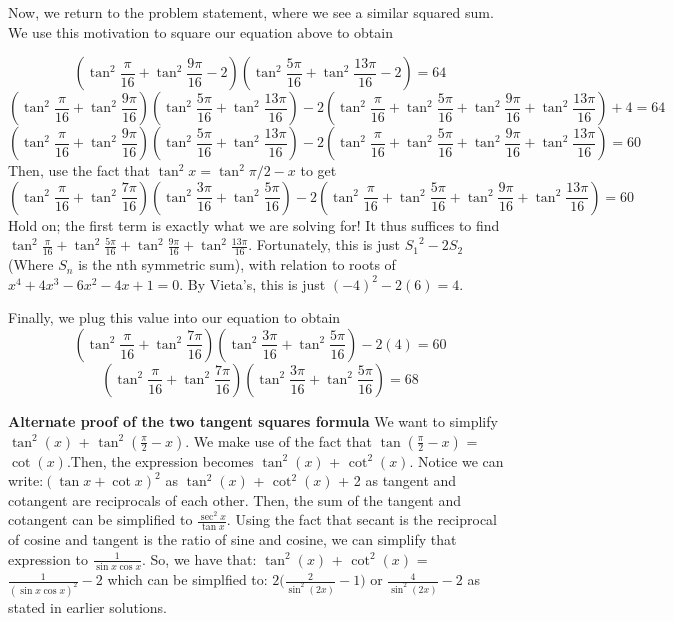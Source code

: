 \begin{enumerate}
 Now, we return to the problem statement, where we see a similar squared sum. We use this motivation to square our equation above to obtain 

 
 \[(\tan^2\frac{\pi}{16}+\tan^2\frac{9\pi}{16}-2)(\tan^2\frac{5\pi}{16}+\tan^2\frac{13\pi}{16}-2)=64\]
 \[(\tan^2\frac{\pi}{16}+\tan^2\frac{9\pi}{16})(\tan^2\frac{5\pi}{16}+\tan^2\frac{13\pi}{16})-2(\tan^2\frac{\pi}{16}+\tan^2\frac{5\pi}{16}+\tan^2\frac{9\pi}{16}+\tan^2\frac{13\pi}{16})+4=64\]
 \[(\tan^2\frac{\pi}{16}+\tan^2\frac{9\pi}{16})(\tan^2\frac{5\pi}{16}+\tan^2\frac{13\pi}{16})-2(\tan^2\frac{\pi}{16}+\tan^2\frac{5\pi}{16}+\tan^2\frac{9\pi}{16}+\tan^2\frac{13\pi}{16})=60\]Then, use the fact that $\tan^2{x}=\tan^2{\pi/2-x}$ to get
 \[(\tan^2\frac{\pi}{16}+\tan^2\frac{7\pi}{16})(\tan^2\frac{3\pi}{16}+\tan^2\frac{5\pi}{16})-2(\tan^2\frac{\pi}{16}+\tan^2\frac{5\pi}{16}+\tan^2\frac{9\pi}{16}+\tan^2\frac{13\pi}{16})=60\]Hold on; the first term is exactly what we are solving for! It thus suffices to find $\tan^2\frac{\pi}{16}+\tan^2\frac{5\pi}{16}+\tan^2\frac{9\pi}{16}+\tan^2\frac{13\pi}{16}$. Fortunately, this is just ${S_1}^2-2{S_2}$ (Where $S_n$ is the nth symmetric sum), with relation to roots of $x^4+4x^3-6x^2-4x+1=0$. By Vieta's, this is just $(-4)^2-2(6)=4$. 

 Finally, we plug this value into our equation to obtain 
 \[(\tan^2\frac{\pi}{16}+\tan^2\frac{7\pi}{16})(\tan^2\frac{3\pi}{16}+\tan^2\frac{5\pi}{16})-2(4)=60\]
 \[(\tan^2\frac{\pi}{16}+\tan^2\frac{7\pi}{16})(\tan^2\frac{3\pi}{16}+\tan^2\frac{5\pi}{16})=\boxed{68}\]

 \textbf{Alternate proof of the two tangent squares formula} We want to simplify $\tan^{2}(x)$ + $\tan^{2}(\frac{\pi}{2} - x)$. We make use of the fact that $\tan(\frac{\pi}{2} - x)$ = $\cot(x)$.Then, the expression becomes $\tan^{2}(x)$ + $\cot^{2}(x)$. Notice we can write:$(\tan x + \cot x)^{2}$ as $\tan^{2}(x)$ + $\cot^{2}(x)$ + 2 as tangent and cotangent are reciprocals of each other. Then, the sum of the tangent and cotangent can be simplified to $\frac{\sec^{2}{x}}{\tan x}$. Using the fact that secant is the reciprocal of cosine and tangent is the ratio of sine and cosine, we can simplify that expression to $\frac{1}{\sin x \cos x}$. So, we have that: $\tan^{2}(x)$ + $\cot^{2}(x)$ = $\frac{1}{(\sin x \cos x)^2} - {2}$ which can be simplfied to: $2\Bigr(\frac{2}{\sin^{2}(2x)} - 1\Bigr)$ or $\frac{4}{\sin^{2}(2x)} - 2$ as stated in earlier solutions. 

 



\end{enumerate}
